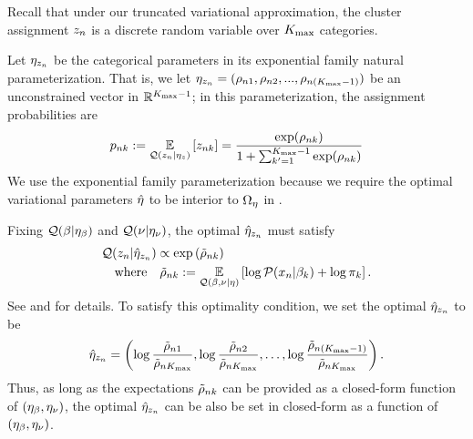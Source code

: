\begin{ex}
Recall that under our truncated variational approximation,
the cluster assignment $z_n$ is a discrete random variable
over ${K_{\mathrm{max}}}$ categories.

Let $\eta_{z_n}$ be the categorical parameters in its exponential family
natural parameterization. That is, we let $\eta_{z_n} = (\rho_{n1},
\rho_{n2}, ..., \rho_{n({K_{\mathrm{max}}}-1)})$ be an unconstrained vector in
$\mathbb{R}^{{K_{\mathrm{max}}}-1}$; in this parameterization, the assignment probabilities
are
%
\begin{align*}
  p_{\n\k} := \expect{\q(\z_\n \vert \etaz)}{\z_{\n\k}} =
  \frac{\exp(\rho_{\n\k})}{1 + \sum_{\k'=1}^{\kmax-1}\exp(\rho_{\n\k})}
\end{align*}
%
We use the exponential family parameterization because we require the optimal
variational parameters $\hat\eta$ to be interior to $\Omega_{\eta}$ in
.

Fixing $\mathcal{Q}(\beta\vert\eta_{\beta})$ and $\mathcal{Q}(\nu\vert\eta_{\nu})$,
the optimal $\hat\eta_{z_n}$ must satisfy
%
\begin{align*}
& \q(\z_\n | \etaopt_{\z_\n}) \propto \exp\left(\tilde \rho_{\n\k}\right)\\
& \mathwhere \tilde \rho_{\n\k} := \expect{\q(\beta, \nu \vert \eta)}
       {\log\p(\x_n \vert \beta_\k) + \log \pi_\k}.
\end{align*}
%
See \citet{bishop:2006:PRML} and \citet{blei:2017:vi_review} for details.
To satisfy this optimality condition,
we set the optimal $\hat\eta_{z_n}$ to be
%
\begin{align*}
%
\etaopt_{\z_\n} = \left(\log\frac{\tilde\rho_{\n1}}{\tilde\rho_{\n\kmax}},
\log\frac{\tilde\rho_{\n2}}{\tilde\rho_{\n\kmax}}, \ldots,
\log\frac{\tilde\rho_{\n(\kmax-1)}}{\tilde\rho_{\n\kmax}}\right).
%
\end{align*}
%
Thus, as long as the expectations $\tilde\rho_{nk}$ can be provided
as a closed-form function of
$(\eta_{\beta}, \eta_{\nu})$, the optimal $\hat\eta_{z_n}$ can be also be set in closed-form as
a function of $(\eta_{\beta}, \eta_{\nu})$.
%
\end{ex}
%

